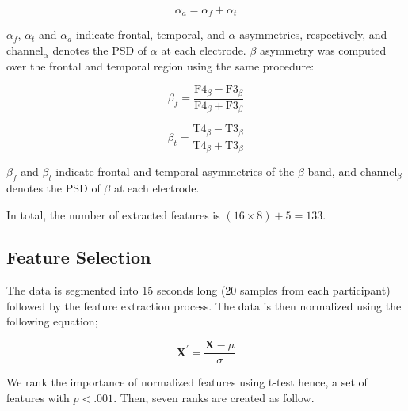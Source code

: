 \documentclass[pdflatex,sn-mathphys]{sn-jnl}%
\theoremstyle{thmstyleone}%
\theoremstyle{thmstyletwo}%
\theoremstyle{thmstylethree}%
\begin{document}
\begin{equation} \label{eq:5}
   \alpha_{a} ={\alpha_{f}+\alpha_{t}}
\end{equation}

$\alpha_{f}$, $\alpha_{t}$ and $\alpha_{a}$ indicate frontal, temporal, and $\alpha$ asymmetries, respectively, and $\text{channel}_\alpha$ denotes the PSD of $\alpha$ at each electrode. $\beta$ asymmetry was computed over the frontal and temporal region using the same procedure:

\begin{equation} \label{eq:6}
    \beta_{f} =\frac{ \text{F4}_{\beta} - \text{F3}_{\beta} }{ \text{F4}_{\beta} + \text{F3}_{\beta} }
\end{equation}

\begin{equation} \label{eq:7}
    \beta_{t} =\frac{ \text{T4}_{\beta} - \text{T3}_{\beta} }{ \text{T4}_{\beta} + \text{T3}_{\beta} }
\end{equation}

$\beta_{f}$ and $\beta_{t}$ indicate frontal and temporal asymmetries of the $\beta$ band, and $\text{channel}_\beta$ denotes the PSD of $\beta$ at each electrode.

In total, the number of extracted features is $(16 \times 8) + 5 = 133$.

\subsection{Feature Selection}\label{sec:feature_selection}
The data is segmented into 15 seconds long (20 samples from each participant) followed by the feature extraction process. The data is then normalized using the following equation;

\begin{equation} \label{eq:normalized}
   \mathbf{X}^{\prime} = \frac{\mathbf{X} - \mu}{\sigma}
\end{equation}

We rank the importance of normalized features using t-test hence, a set of features with $p < .001$. Then, seven ranks are created as follow.
\end{document}
